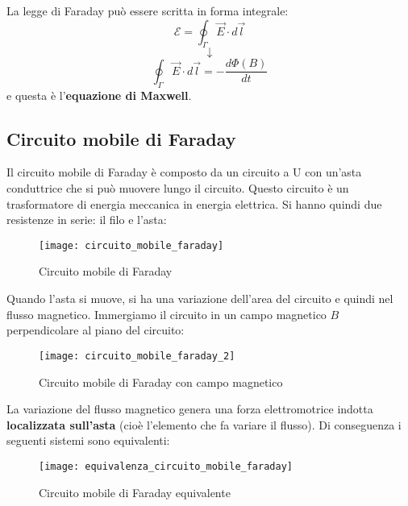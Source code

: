 \documentclass[a4paper]{article}
\begin{document}
\vspace{1em}
\noindent
La legge di Faraday può essere scritta in forma integrale:
\[
  \mathcal{E} = \oint_{\Gamma} \vec{E} \cdot d\vec{l} 
\] 
\[
  \downarrow
\] 
\[
  \oint_{\Gamma} \vec{E} \cdot d\vec{l} = - \frac{d \Phi (B)}{dt}
\] 
e questa è l'\textbf{equazione di Maxwell}.

\subsection{Circuito mobile di Faraday}
Il circuito mobile di Faraday è composto da un circuito a U con un'asta conduttrice
che si può muovere lungo il circuito. Questo circuito è un trasformatore di energia
meccanica in energia elettrica. Si hanno quindi due resistenze in serie: il filo
e l'asta:
\begin{figure}[H]
  \centering
  \texttt{[image: circuito\_mobile\_faraday]}
  \caption{Circuito mobile di Faraday}
\end{figure}
\noindent
Quando l'asta si muove, si ha una variazione dell'area del circuito e quindi nel flusso
magnetico. Immergiamo il circuito in un campo magnetico \( B \) perpendicolare al piano
del circuito:
\begin{figure}[H]
  \centering
  \texttt{[image: circuito\_mobile\_faraday\_2]}
  \caption{Circuito mobile di Faraday con campo magnetico}
\end{figure}
\noindent
La variazione del flusso magnetico genera una forza elettromotrice indotta \textbf{
localizzata sull'asta} (cioè l'elemento che fa variare il flusso). Di conseguenza 
i seguenti sistemi sono equivalenti:
\begin{figure}[H]
  \centering
  \texttt{[image: equivalenza\_circuito\_mobile\_faraday]}
  \caption{Circuito mobile di Faraday equivalente}
\end{figure}
\end{document}
